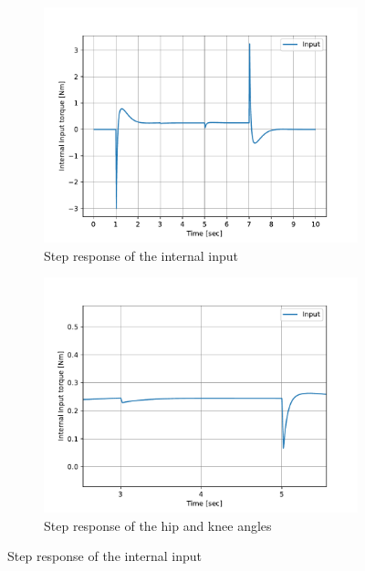 \begin{figure}[h]
	\centering
	\begin{subfigure}[t]{0.45\textwidth}
		\centering
		\includegraphics[width=\textwidth]{Step Response of the Internal Input}
		\caption{Step response of the internal input}
		\label{fig:Step response of the internal input}
	\end{subfigure}
	\begin{subfigure}[t]{0.45\textwidth}
		\centering
		\includegraphics[width=\textwidth]{Step Response of the Internal Input hip angle}
		\caption{Step response of the hip and knee angles}
		\label{fig:Step response of the hip and knee angles}
	\end{subfigure}
	\caption{Step response of the internal input}
	\label{fig:Step response of the internal input}
\end{figure}
